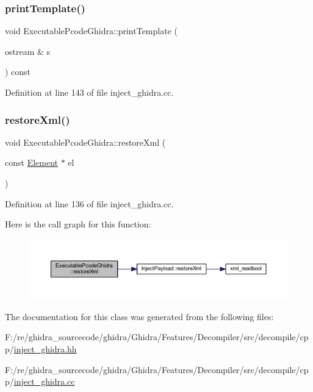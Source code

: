 \subsubsection{\texorpdfstring{printTemplate()}{printTemplate()}}
{\footnotesize\ttfamily void Executable\+Pcode\+Ghidra\+::print\+Template (\begin{DoxyParamCaption}\item[{ostream \&}]{s }\end{DoxyParamCaption}) const\hspace{0.3cm}{\ttfamily [virtual]}}



Definition at line 143 of file inject\+\_\+ghidra.\+cc.

\mbox{\label{class_executable_pcode_ghidra_a428bdbe98c4d715c72100ed91d2035c8}} 
\subsubsection{\texorpdfstring{restoreXml()}{restoreXml()}}
{\footnotesize\ttfamily void Executable\+Pcode\+Ghidra\+::restore\+Xml (\begin{DoxyParamCaption}\item[{const \mbox{\hyperlink{class_element}{Element}} $\ast$}]{el }\end{DoxyParamCaption})\hspace{0.3cm}{\ttfamily [virtual]}}



Definition at line 136 of file inject\+\_\+ghidra.\+cc.

Here is the call graph for this function\+:
\nopagebreak
\begin{figure}[H]
\begin{center}
\leavevmode
\includegraphics[width=350pt]{class_executable_pcode_ghidra_a428bdbe98c4d715c72100ed91d2035c8_cgraph}
\end{center}
\end{figure}


The documentation for this class was generated from the following files\+:\begin{DoxyCompactItemize}
\item 
F\+:/re/ghidra\+\_\+sourcecode/ghidra/\+Ghidra/\+Features/\+Decompiler/src/decompile/cpp/\mbox{\hyperlink{inject__ghidra_8hh}{inject\+\_\+ghidra.\+hh}}\item 
F\+:/re/ghidra\+\_\+sourcecode/ghidra/\+Ghidra/\+Features/\+Decompiler/src/decompile/cpp/\mbox{\hyperlink{inject__ghidra_8cc}{inject\+\_\+ghidra.\+cc}}\end{DoxyCompactItemize}
